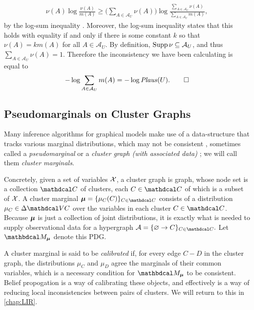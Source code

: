\begin{lproof}
\begin{align*}
                \nu(A) \log \frac{\nu(A)}{m(A)} 
    \ge \Big({\textstyle\sum_{A \in \mathcal A_U} \nu(A)} \Big)
        \log \frac{\textstyle\sum_{A \in \mathcal A_U} \nu(A)}{{\textstyle\sum_{A \in \mathcal A_U} m(A)}},
    \end{align*}
    by the log-sum inequality \citep{CoverThomas}.
    Moreover, the log-sum inequality states that this holds 
    with equality if and only if there is some constant $k$ so that
        $\nu(A) = k m(A)$ for all $A \in \mathcal A_U$. 
    By definition, $\operatorname{\mathrm{Supp}} \nu \subseteq \mathcal A_U$, and thus
    $\sum_{A \in \mathcal A_U} \nu(A) = 1$. Therefore the inconsistency 
    we have been calculating is equal to
    \[
        - \log \sum_{A \in \mathcal A_U} m(A) = - \log \mathit{Plaus}(U).
        \qedhere
    \]
\end{lproof}




\subsection{Pseudomarginals on Cluster Graphs}
    \label{ssec:pseudomarginal-cluster-graph}

Many inference algorithms for graphical models make use of a data-structure that tracks various marginal distributions, which may not be consistent \citep{wainwright2003tree,wainwright2008graphical,KF09},
sometimes called a \emph{pseudomarginal} \citep{wainwright2008graphical} or a \emph{cluster graph (with associated data)} \citep{KF09}; we will call them \emph{cluster marginals}.

Concretely, given a set of variables $\mathcal X$, a cluster graph is 
graph, whose node set is a collection $\C$ of clusters, each $C \in \C$ of which is a subset of $\mathcal X$. 
A cluster marginal $\bmu = \{ \mu_C(C) \}_{C \in \C}$ consists of a distribution $\mu_C \in \Delta \V C$ over the variables in each cluster $C \in \C$.
Because $\boldsymbol\mu$ is just a collection of joint distributions, 
it is exactly what is needed to supply observational data for a hypergraph
$
    \Ar = \{ \varnothing \to C \}_{C \in \C}.
$
Let $\dg M_{\bmu}$ denote this PDG.
 
A cluster marginal is said to be \emph{calibrated} if, for every edge $C{-}D$ in the cluster graph, the distributions $\mu_C$ and $\mu_D$ agree the marginals of their common variables, which is a necessary condition for $\dg M_{\bmu}$ to be consistent.
Belief propogation is a way of calibrating these objects, and effectively is a way of reducing local inconsistencies between pairs of clusters. We will return to this in \cref{chap:LIR}. 

